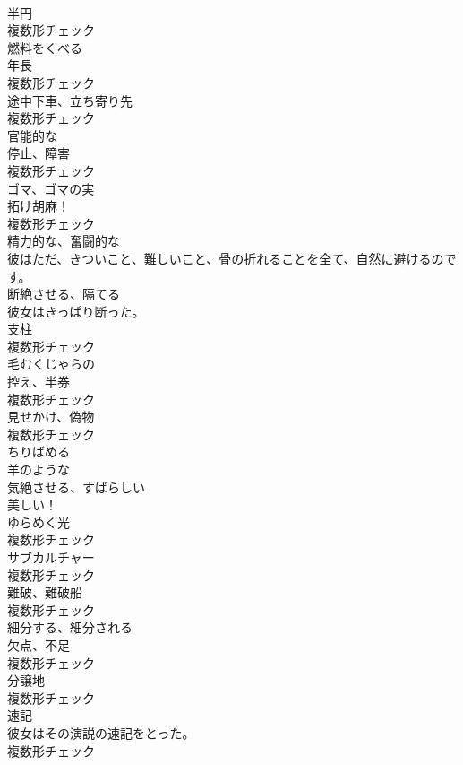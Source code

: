 \documentclass[8pt]{extreport}
\begin{document}
\begin{CJK}{UTF8}{min}
\\	[名詞]	半円	
\\	複数形チェック
\\	[動詞]	燃料をくべる	
\\	[名詞]	年⻑	
\\	複数形チェック
\\	[名詞]	途中下車、立ち寄り先	
\\	複数形チェック
\\	[形容詞]	官能的な	
\\	[名詞]	停止、障害	
\\	複数形チェック
\\	[名詞]	ゴマ、ゴマの実	
\\	拓け胡麻！	
\\	複数形チェック
\\	[形容詞]	精力的な、奮闘的な	
\\	彼はただ、きついこと、難しいこと、骨の折れることを全て、自然に避けるのです。	
\\	[動詞]	断絶させる、隔てる	
\\	彼女はきっぱり断った。	
\\	[名詞]	支柱	
\\	複数形チェック
\\	[形容詞]	毛むくじゃらの	
\\	[名詞]	控え、半券	
\\	複数形チェック
\\	[名詞]	見せかけ、偽物	
\\	複数形チェック
\\	[動詞]	ちりばめる	
\\	[形容詞]	羊のような	
\\	[形容詞]	気絶させる、すばらしい	
\\	美しい！	
\\	[名詞]	ゆらめく光	
\\	複数形チェック
\\	[名詞]	サブカルチャー	
\\	複数形チェック
\\	[名詞]	難破、難破船	
\\	複数形チェック
\\	[動詞]	細分する、細分される	
\\	[名詞]	欠点、不足	
\\	複数形チェック
\\	[名詞]	分譲地	
\\	複数形チェック
\\	[名詞]	速記	
\\	彼女はその演説の速記をとった。	
\\	複数形チェック

\end{CJK}
\end{document}
